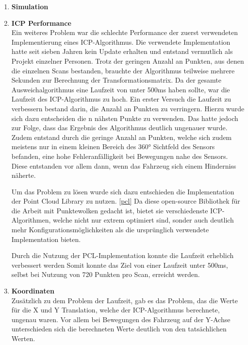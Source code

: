\begin{enumerate}[leftmargin=*]
    \item \textbf{Simulation} \\

    \item \textbf{ICP Performance} \\
    Ein weiteres Problem war die schlechte Performance der zuerst verwendeten Implementierung eines ICP-Algorithmus.
    Die verwendete Implementation hatte seit sieben Jahren kein Update erhalten und entstand vermutlich als Projekt einzelner Personen.
    Trotz der geringen Anzahl an Punkten, aus denen die einzelnen Scans bestanden, brauchte der Algorithmus teilweise mehrere Sekunden zur Berechnung der Transformationsmatrix.
    Da der gesamte Ausweichalgorithmus eine Laufzeit von unter 500ms haben sollte, war die Laufzeit des ICP-Algorithmus zu hoch.
    Ein erster Versuch die Laufzeit zu verbessern bestand darin, die Anzahl an Punkten zu verringern.
    Hierzu wurde sich dazu entscheiden die n nähsten Punkte zu verwenden.
    Das hatte jedoch zur Folge, dass das Ergebnis des Algorithmus deutlich ungenauer wurde.
    Zudem entstand durch die geringe Anzahl an Punkten, welche sich zudem meistens nur in einem kleinen Bereich des 360° Sichtfeld des Sensors befanden, 
    eine hohe Fehleranfälligkeit bei Bewegungen nahe des Sensors.
    Diese entstanden vor allem dann, wenn das Fahrzeug sich einem Hinderniss näherte.

    Um das Problem zu lösen wurde sich dazu entschieden die Implementation der Point Cloud Library zu nutzen. \ref{pcl}
    Da diese open-source Bibliothek für die Arbeit mit Punktewolken gedacht ist, bietet sie verschiedenste ICP-Algorithmen,
    welche nicht nur extrem optimiert sind, sonder auch deutlich mehr Konfigurationsmöglichkeiten als die ursprünglich verwendete Implementation bieten.
    
    Durch die Nutzung der PCL-Implementation konnte die Laufzeit erheblich verbessert werden
    Somit konnte das Ziel von einer Laufzeit unter 500ms, selbst bei Nutzung von 720 Punkten pro Scan, erreicht werden.

    \item \textbf{Koordinaten} \\
    Zusätzlich zu dem Problem der Laufzeit, gab es das Problem, das die Werte für die X und Y Translation, welche der ICP-Algorithmus berechnete, ungenau waren.
    Vor allem bei Bewegungen des Fahrzeug auf der Y-Achse unterschieden sich die berechneten Werte deutlich von den tatsächlichen Werten.
    

\end{enumerate}
